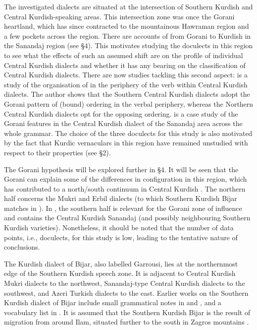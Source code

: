 \documentclass[output=paper,colorlinks,citecolor=brown]{langscibook}
\begin{document}
\begin{sloppypar}
The investigated dialects are situated at the intersection of Southern Kurdish and Central Kurdish-speaking areas. This intersection zone was once the Gorani heartland, which has since contracted to the mountainous Hawraman region and a few pockets across the region. There are accounts of  from Gorani to Kurdish in the Sanandaj region (see §4). This motivates studying the doculects in this region to see what the effects of such an assumed shift are on the  profile of individual Central Kurdish dialects and whether it has any bearing on the classification of Central Kurdish dialects. There are now studies tackling this second aspect: \citet{mohammadirad_bound_nodate} is a study of the organisation of  in the periphery of the verb within Central Kurdish dialects. The author shows that the Southern Central Kurdish dialects adopt the Gorani pattern of (bound)  ordering in the verbal periphery, whereas the Northern Central Kurdish dialects opt for the opposing ordering. \citet{mohammadirad_gorani_inpress} is a case study of the Gorani  features in the Central Kurdish dialect of the Sanandaj area across the whole grammar. The choice of the three doculects for this study is also motivated by the fact that Kurdic vernaculars in this region have remained unstudied with respect to their  properties (see §2). 

The Gorani  hypothesis will be explored further in §4. It will be seen that the Gorani  can explain some of the differences in  configuration in this region, which has contributed to a north/south continuum in Central Kurdish . The northern half concerns the Mukri and Erbil dialects (to which Southern Kurdish Bijar matches in ). In , the southern half is relevant for the Gorani zone of influence and contains the Central Kurdish Sanandaj (and possibly neighbouring Southern Kurdish varieties). Nonetheless, it should be noted that the number of data points, i.e., doculects, for this study is low, leading to the tentative nature of conclusions. 

 The Kurdish dialect of Bijar, also labelled Garrousi, lies at the northernmost edge of the Southern Kurdish speech zone. It is adjacent to Central Kurdish Mukri dialects to the northwest, Sanandaj-type Central Kurdish dialects to the southwest, and Azeri Turkish dialects to the east. Earlier works on the Southern Kurdish dialect of Bijar include small grammatical notes in \citet{de_morgan_mission_1904} and \citet{Fattah2000}, and a vocabulary list in \citet{querry_dialecte_1896}. It is assumed that the Southern Kurdish Bijar is the result of migration from around Ilam, situated further to the south in Zagros mountains \citep[18]{Fattah2000}{}. 
 

\end{sloppypar}
\end{document}
